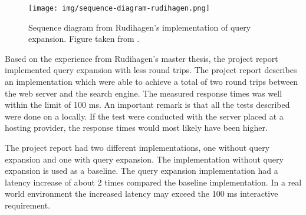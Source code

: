 \begin{figure}[h!]
  \centering \texttt{[image: img/sequence-diagram-rudihagen.png]}
  \caption{Sequence diagram from Rudihagen's implementation of query expansion. Figure taken from \cite{master-thesis}.}
  \label{fig:sequence-diagram-rudihagen}
\end{figure}

Based on the experience from Rudihagen's master thesis,
the project report \cite{project-report} implemented query expansion with less round trips.
The project report describes an implementation which were able to achieve a total of two round trips between the web server and the search engine.
The measured response times was well within the limit of 100 ms.
An important remark is that all the tests described were done on a locally.
If the test were conducted with the server placed at a hosting provider,
the response times would most likely have been higher.

The project report had two different implementations, one without query expansion and one with query expansion.
The implementation without query expansion is used as a baseline.
The query expansion implementation had a latency increase of about 2 times compared the baseline implementation.
In a real world environment the increased latency may exceed the 100 ms interactive requirement.



